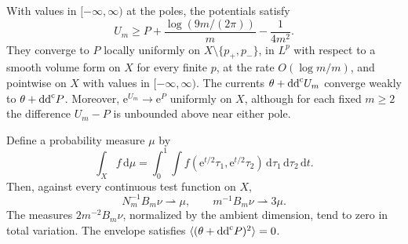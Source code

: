 \begin{theorem}\label{thm:pencil-ideal-kernel-limits}
With values in $[-\infty,\infty)$ at the poles, the potentials satisfy
\begin{equation}\label{eq:pencil-global-lower}
 U_m\geq P+\frac{\log(9m/(2\pi))}{m}-\frac1{4m^2}.
\end{equation}
They converge to $P$ locally uniformly on $X\setminus\{p_+,p_-\}$, in $L^p$ with respect to a smooth volume form on $X$ for every finite $p$, at the rate $O(\log m/m)$, and pointwise on $X$ with values in $[-\infty,\infty)$. The currents $\theta+\mathrm{dd}^{\mathrm{c}} U_m$ converge weakly to $\theta+\mathrm{dd}^{\mathrm{c}} P$. Moreover, $\mathrm e^{U_m}\to \mathrm e^P$ uniformly on $X$, although for each fixed $m\geq2$ the difference $U_m-P$ is unbounded above near either pole.

Define a probability measure $\mu$ by
\[
 \int_X f\,\mathrm d\mu=\int_0^1\int f(\mathrm e^{t/2}\tau_1,\mathrm e^{t/2}\tau_2)
                          \,\mathrm d\tau_1\,\mathrm d\tau_2\,\mathrm dt.
\]
Then, against every continuous test function on $X$,
\[
 N_m^{-1}B_m\nu\rightharpoonup\mu,\qquad
 m^{-1}B_m\nu\rightharpoonup3\mu.
\]
The measures $2m^{-2}B_m\nu$, normalized by the ambient dimension, tend to zero in total variation. The envelope satisfies $\langle(\theta+\mathrm{dd}^{\mathrm{c}} P)^2\rangle=0$.
\end{theorem}
